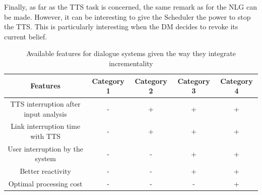              Finally, as far as the TTS task is concerned, the same remark as for the NLG can be made. However, it can be interesting to give the Scheduler the power to stop the TTS. This is particularly interesting when the DM decides to revoke its current belief.

             \begin{table}[!ht]
      	     \footnotesize
             \centering
             \begin{tabular}{|c|c|c|c|c|}
               \hline
               \textbf{Features}	& \textbf{Category 1} & \textbf{Category 2} & \textbf{Category 3} & \textbf{Category 4} \\
               \hline
               TTS interruption after input analysis & - & + & + & + \\
               \hline
               Link interruption time with TTS & - & + & + & + \\
               \hline
               User interruption by the system & - & - & + & + \\
               \hline
               Better reactivity & - & - & + & + \\
               \hline
               Optimal processing cost & - & - & - & + \\
               \hline
             \end{tabular}
             \caption{Available features for dialogue systems given the way they integrate incrementality}
             \label{tab:incrclassif}
             \end{table}

